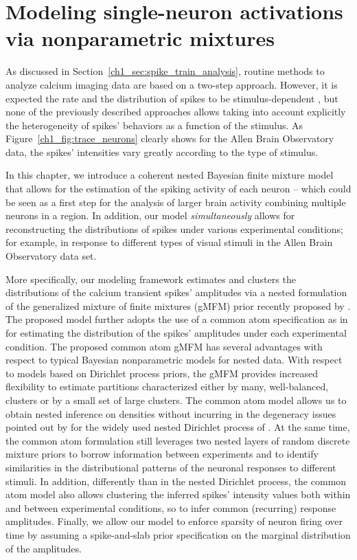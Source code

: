 \chapter{Modeling single-neuron activations via nonparametric mixtures}

\vspace{.7cm}
As discussed in Section~\ref{ch1_sec:spike_train_analysis}, routine methods to analyze calcium imaging data are based on a two-step approach. 
However, it is expected the rate and the distribution of spikes to be stimulus-dependent \parencite{Brenner2002PhysRevE}, but none of the previously described approaches allows taking into account explicitly the heterogeneity of spikes' behaviors as a function of the stimulus. 
As Figure~\ref{ch1_fig:trace_neurons} clearly shows for the Allen Brain Observatory data, the spikes' intensities vary greatly according to the type of stimulus.

In this chapter, we introduce a coherent nested Bayesian finite mixture model that allows for the estimation of the spiking activity of each neuron -- which could be seen as a first step for the analysis of larger brain activity combining multiple neurons in a region. In addition, our model \textit{simultaneously} allows for reconstructing the distributions of spikes under various experimental conditions; for example, in response to different types of visual stimuli in the Allen Brain Observatory data set. 

More specifically, our modeling framework estimates and clusters the distributions of the calcium transient spikes' amplitudes via a nested formulation of the generalized mixture of finite mixtures (gMFM) prior recently proposed by \textcite{fruhwirthschnatter2020}. 
The proposed model further adopts the use of a common atom specification as in \textcite{denti2021} for estimating the distribution of the spikes' amplitudes under each experimental condition. The proposed common atom gMFM has several advantages with respect to typical Bayesian nonparametric models for nested data. With respect to models based on Dirichlet process priors, the gMFM provides increased flexibility to estimate partitions characterized either by many, well-balanced, clusters or by a small set of large clusters. The common atom model allows us to obtain nested inference on densities without incurring in the degeneracy issues pointed out by \textcite{camerlenghi2019} for the widely used nested Dirichlet process of \textcite{rodriguez2008}. At the same time, the common atom formulation still leverages two nested layers of random discrete mixture priors to borrow information between experiments and to identify similarities in the distributional patterns of the neuronal responses to different stimuli. In addition, differently than in the nested Dirichlet process, the common atom model also allows clustering the inferred spikes' intensity values both within and between experimental conditions, so to infer common (recurring) response amplitudes. Finally, we allow our model to enforce sparsity of neuron firing over time by assuming a spike-and-slab prior specification on the marginal distribution of the amplitudes.


